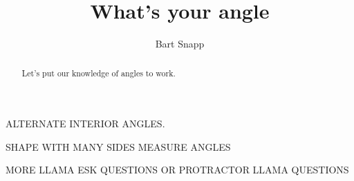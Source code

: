 \documentclass[handout,nooutcomes,noauthor]{ximera}
\title{What's your angle}
\author{Bart Snapp}
\begin{document}
\begin{abstract}
  Let's put our knowledge of angles to work. 
\end{abstract}
\maketitle


\begin{listOutcomes}
\item 
\end{listOutcomes}

\mynewpage



\begin{question}
ALTERNATE INTERIOR ANGLES.

\end{question}

\mynewpage


\begin{question}
  SHAPE WITH MANY SIDES MEASURE ANGLES 
\end{question}

\mynewpage


\begin{question}
  MORE LLAMA ESK QUESTIONS OR PROTRACTOR LLAMA QUESTIONS
\end{question}
\end{document}
